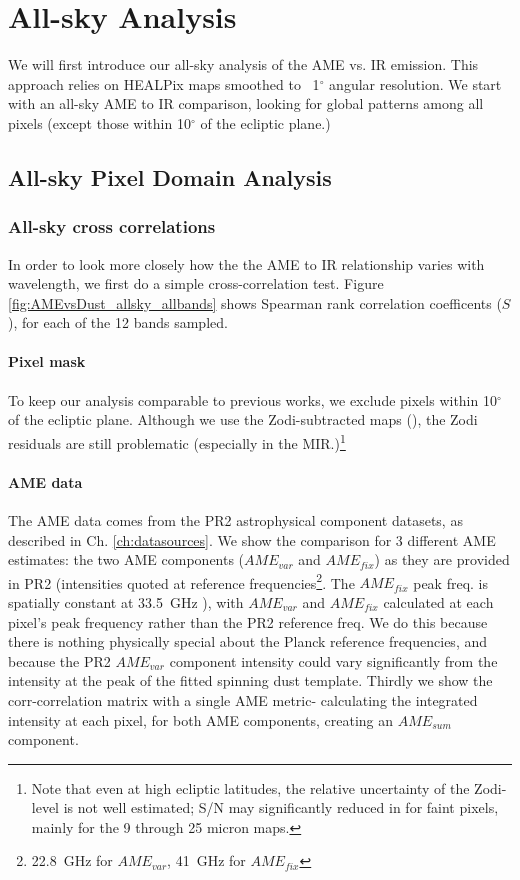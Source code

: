\chapter{All-sky Analysis}
\label{sec:analysis}

    We will first introduce our all-sky analysis of the AME vs. IR emission. This approach relies on HEALPix maps smoothed to  ~1$^{\circ}$ angular resolution. We start with an all-sky AME to IR comparison, looking for global patterns among all pixels (except those within 10$^{\circ}$ of the ecliptic plane.)

\section{All-sky Pixel Domain Analysis}
  \subsection{All-sky cross correlations}
  	In order to look more closely how the the AME to IR relationship varies with wavelength, we first do a simple cross-correlation test. Figure \ref{fig:AMEvsDust_allsky_allbands} shows Spearman rank correlation coefficents ($S$), for each of the 12 bands sampled.

    \subsubsection{Pixel mask}
      To keep our analysis comparable to previous works, we exclude pixels within 10$^{\circ}$ of the ecliptic plane. Although we use the Zodi-subtracted maps (\citep{kelsall98, kondo16}), the Zodi residuals are still problematic (especially in the MIR.)\footnote{Note that even at high ecliptic latitudes, the relative uncertainty of the Zodi-level is not well estimated; S/N may significantly reduced in for faint pixels, mainly for the 9 through 25 micron maps.}

    \subsubsection{AME data}
       The AME data comes from the PR2 astrophysical component datasets, as described in Ch. \ref{ch:datasources}. We show the comparison for 3 different AME estimates: the two AME components ($AME_{var}$ and $AME_{fix}$) as they are provided in PR2 (intensities quoted at reference frequencies\footnote{22.8~GHz for $AME_{var}$, 41~GHz for $AME_{fix}$}. The  $AME_{fix}$ peak freq. is spatially constant at 33.5~GHz ), with $AME_{var}$ and $AME_{fix}$ calculated at each pixel's peak frequency rather than the PR2 reference freq. We do this because there is nothing physically special about the Planck reference frequencies, and because the PR2 $AME_{var}$ component intensity could vary significantly from the intensity at the peak of the fitted spinning dust template. Thirdly we show the corr-correlation matrix with a single AME metric- calculating the integrated intensity at each pixel, for both AME components, creating an $AME_{sum}$ component.



